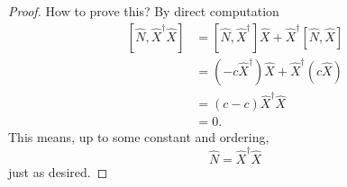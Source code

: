 \begin{proof}
How to prove this? By direct computation
\begin{subequations}
\begin{align}
[\widehat{N},\widehat{X}^\dag\widehat{X}]&=[\widehat{N},\widehat{X}^\dag]\widehat{X}+\widehat{X}^{\dag}[\widehat{N},\widehat{X}]\\
&=(-c\widehat{X}^\dag)\widehat{X}+\widehat{X}^\dag(c\widehat{X})\\
&=(c-c)\widehat{X}^\dag\widehat{X}\\
&=0.
\end{align}
\end{subequations}
This means, up to some constant and ordering,
\begin{equation}%
\widehat{N}=\widehat{X}^\dag\widehat{X}
\end{equation}
just as desired.
\end{proof}
